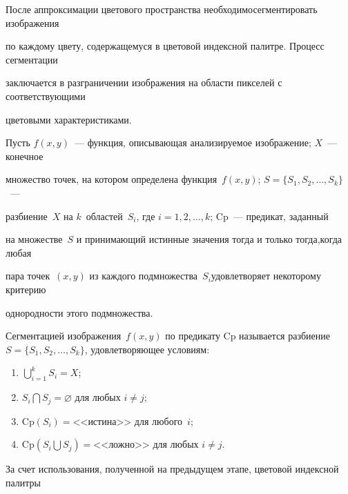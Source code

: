 После аппроксимации цветового пространства необходимо\linebreak сегментировать изображения 


по каждому цвету, содержащемуся в цветовой индексной палитре. Процесс сегментации 


заключается в разграничении изображения на области пикселей с соответствующими 


цветовыми характеристиками. 





Пусть $f(x,y)$~--- функция, описывающая анализируемое изоб\-ра\-жение; $X$~--- конечное 


множество точек, на котором определена функция~$f(x,y)$; $S = \{S_1, S_2, \ldots , S_k\}$~--- 


разбиение~$X$ на $k$~об\-ла\-стей~$S_i$, где $i = 1,2, \ldots , k$; Cp~--- предикат, заданный 


на множестве~$S$ и принимающий истинные значения тогда и только тогда,\linebreak когда любая 


пара точек~$(x,y)$ из каждого подмножества~$S_i$\linebreak удовле\-тво\-ря\-ет некоторому критерию 


одно\-род\-ности этого подмножества.





Сегментацией изображения~$f(x,y)$ по предикату Cp называется разбиение $S = \{S_1,S_2, 


\ldots , S_k\}$, удовлетворяющее условиям:


\begin{enumerate}[(1)]


\item $\bigcup\limits_{i=1}^k S_i=X$;


\item $S_i \bigcap S_j=\varnothing$ для любых $i\not = j$;


\item  $\mathrm{Cp}(S_i) = \mbox{<<истина>>}$ для любого~$i$;


\item $\mathrm{Cp}(S_i  \bigcup S_j) = \mbox{<<ложно>>}$ для любых $i\not= j$.


\end{enumerate}





За счет использования, полученной на предыдущем этапе, цветовой индексной палитры 


